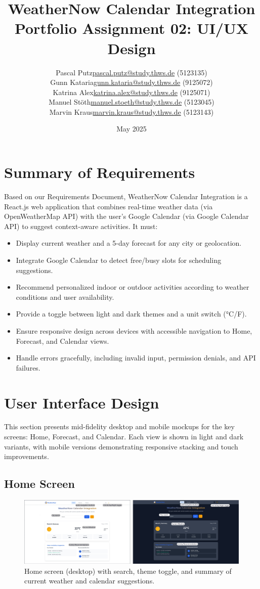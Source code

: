 \documentclass[11pt,a4paper]{article}
\title{WeatherNow Calendar Integration\\\large Portfolio Assignment 02: UI/UX Design}
\author{
  \begin{tabular}{ll}
    Pascal Putz & \href{mailto:pascal.putz@study.thws.de}{pascal.putz@study.thws.de} (5123135)\\
    Gunn Kataria & \href{mailto:gunn.kataria@study.thws.de}{gunn.kataria@study.thws.de} (9125072)\\
    Katrina Alex & \href{mailto:katrina.alex@study.thws.de}{katrina.alex@study.thws.de} (9125071)\\
    Manuel Stöth & \href{mailto:manuel.stoeth@study.thws.de}{manuel.stoeth@study.thws.de} (5123045)\\
    Marvin Kraus & \href{mailto:marvin.kraus@study.thws.de}{marvin.kraus@study.thws.de} (5123143)
  \end{tabular}
}
\date{May 2025}
\begin{document}
\maketitle
\tableofcontents

\newpage

\section{Summary of Requirements}
Based on our Requirements Document, WeatherNow Calendar Integration is a React.js web application that combines real-time weather data (via OpenWeatherMap API) with the user’s Google Calendar (via Google Calendar API) to suggest context-aware activities. It must:

\begin{itemize}[noitemsep]
  \item Display current weather and a 5-day forecast for any city or geolocation.
  \item Integrate Google Calendar to detect free/busy slots for scheduling suggestions.
  \item Recommend personalized indoor or outdoor activities according to weather conditions and user availability.
  \item Provide a toggle between light and dark themes and a unit switch (°C/\textdegree F).
  \item Ensure responsive design across devices with accessible navigation to Home, Forecast, and Calendar views.
  \item Handle errors gracefully, including invalid input, permission denials, and API failures.
\end{itemize}

\section{User Interface Design}
This section presents mid-fidelity desktop and mobile mockups for the key screens: Home, Forecast, and Calendar. Each view is shown in light and dark variants, with mobile versions demonstrating responsive stacking and touch improvements.

\subsection{Home Screen}
\FloatBarrier
\begin{figure}[H]
  \centering
  \includegraphics[width=\linewidth]{desktop_home_descripted.jpg}
  \caption{Home screen (desktop) with search, theme toggle, and summary of current weather and calendar suggestions.}
  \label{fig:home_desktop}
\end{figure}
\FloatBarrier
\end{document}

